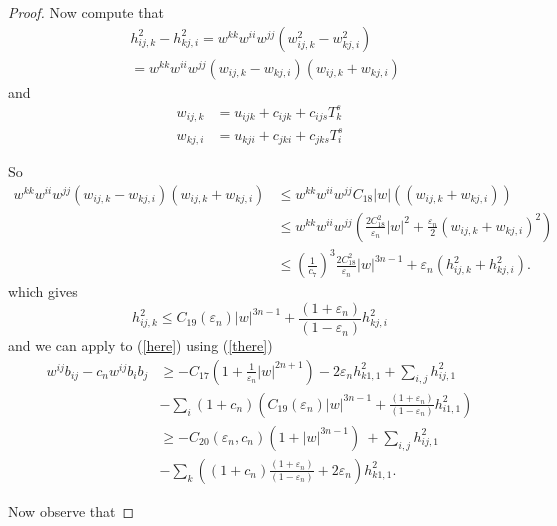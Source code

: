 \documentclass[11pt,letterpaper]{amsart}%
\numberwithin{equation}{section}
\begin{document}
\begin{proof}
Now compute that
\begin{align*}
&  h_{ij,k}^{2}-h_{kj,i}^{2}=w^{kk}w^{ii}w^{jj}(w_{ij,k}^{2}-w_{kj,i}^{2})\\
&  =w^{kk}w^{ii}w^{jj}(w_{ij,k}-w_{kj,i})(w_{ij,k}+w_{kj,i})
\end{align*}
and
\begin{align*}
w_{ij,k}  &  =u_{ijk}+c_{ijk}+c_{ijs}T_{k}^{s}\\
w_{kj,i}  &  =u_{kji}+c_{jki}+c_{jks}T_{i}^{s}%
\end{align*}


So
\begin{align*}
w^{kk}w^{ii}w^{jj}(w_{ij,k}-w_{kj,i})(w_{ij,k}+w_{kj,i}) &  \leq w^{kk}%
w^{ii}w^{jj}C_{18}\left\vert w\right\vert \left(  (w_{ij,k}+w_{kj,i})\right)
\\
&  \leq w^{kk}w^{ii}w^{jj}\left(  \frac{2C_{18}^{2}}{\varepsilon_{n}%
}\left\vert w\right\vert ^{2}+\frac{\varepsilon_{n}}{2}(w_{ij,k}+w_{kj,i}%
)^{2}\right)  \\
&  \leq\left(  \frac{1}{c_{7}}\right)  ^{3}\frac{2C_{18}^{2}}{\varepsilon_{n}%
}\left\vert w\right\vert ^{3n-1}+\varepsilon_{n}\left(  h_{ij,k}^{2}%
+h_{kj,i}^{2}\right) .
\end{align*}
which gives
\[
h_{ij,k}^{2}\leq C_{19}\left(  \varepsilon_{n}\right)  \left\vert w\right\vert
^{3n-1}+\frac{\left(  1+\varepsilon_{n}\right)  }{(1-\varepsilon_{n})}%
h_{kj,i}^{2}%
\]
and we can apply to (\ref{here}) using (\ref{there})
\begin{align}
w^{ij}b_{ij}-c_{n}w^{ij}b_{i}b_{j} &  \geq-C_{17}\left(  1+\frac
{1}{\varepsilon_{n}}\left\vert w\right\vert ^{2n+1}\right)  -2\varepsilon
_{n}h_{k1,1}^{2}+\sum_{i,j}h_{ij,1}^{2}\label{se4}\\
&  -\sum_{i}(1+c_{n})\left(  C_{19}\left(  \varepsilon_{n}\right)  \left\vert
w\right\vert ^{3n-1}+\frac{\left(  1+\varepsilon_{n}\right)  }{(1-\varepsilon
_{n})}h_{i1,1}^{2}\right)  \nonumber\\
&  \geq-C_{20}(\varepsilon_{n},c_{n})(1+\left\vert w\right\vert ^{3n-1}%
)\ +\sum_{i,j}h_{ij,1}^{2}\nonumber\\
&  -\sum_{k}\left(  (1+c_{n})\frac{\left(  1+\varepsilon_{n}\right)
}{(1-\varepsilon_{n})}+2\varepsilon_{n}\right)  h_{k1,1}^{2}.\nonumber
\end{align}



Now observe that%


\end{proof}
\end{document}
